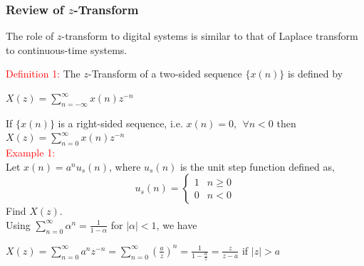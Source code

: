 \documentclass[mathserif, 10pt]{beamer} %
\begin{document}
\frame
{

\frametitle{Review of $z$-Transform}

\small
The role of $z$-transform to digital systems is similar to that of Laplace transform to continuous-time systems.

\textcolor{red}{Definition 1:}   The $z$-Transform of a two-sided sequence $\{x(n)\}$ is defined by \\ \vspace{.2in}

$X(z) = \sum_{n=-  \infty}^{\infty} x(n)z^{-n}$ \\ \vspace{.2in}

If $\{x(n)\}$ is a right-sided sequence, i.e. $x(n) = 0, ~~\forall  n<0$ then \\ \vspace{.1in}
$X(z) = \sum_{n=0}^{\infty} x(n)z^{-n}$ \\ %
\vspace{.1in}
\textcolor{red}{Example 1:}  \\
Let  $x(n) = a^n u_s(n)$, where $u_s(n)$ is the unit step function defined as, \\
\[u_s(n)= \begin{cases}
  1 & n \geq 0 \\
0 & n<0 \end{cases} \]
Find $X(z)$. \\
Using  $\sum_{n=0}^{\infty} \alpha^n=\frac{1}{1-\alpha}$ for $|\alpha|<1$, we have \\ \vspace{.1in}

$X(z) = \sum_{n=0}^{\infty} a^n z^{-n} = \sum_{n=0}^{\infty} (\frac{a}{z})^{n}=\frac{1}{1-\frac{a}{z}}=\frac{z}{z-a}$ if $|z|>a$ \\ \vspace{.7in}

}
\frame
\end{document}
